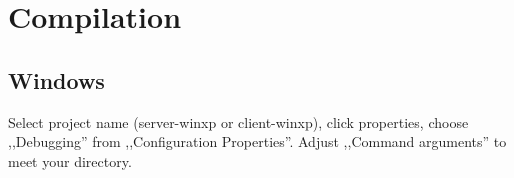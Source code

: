 
\section{Compilation}

\subsection{Windows}
Select project name (server-winxp or client-winxp), click properties,
choose ,,Debugging'' from ,,Configuration Properties''. Adjust ,,Command
arguments'' to meet your directory.

